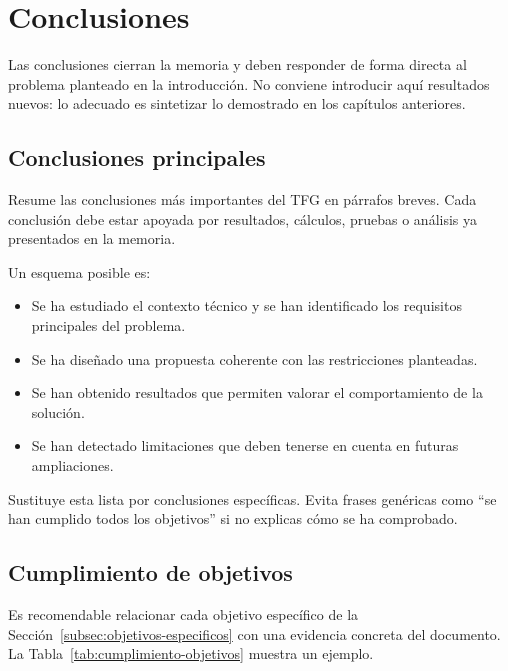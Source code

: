 \chapter{Conclusiones}
\label{cap:conclusiones}

Las conclusiones cierran la memoria y deben responder de forma directa al
problema planteado en la introducción. No conviene introducir aquí resultados
nuevos: lo adecuado es sintetizar lo demostrado en los capítulos anteriores.

\section{Conclusiones principales}
\label{sec:conclusiones-principales}

Resume las conclusiones más importantes del TFG en párrafos breves. Cada
conclusión debe estar apoyada por resultados, cálculos, pruebas o análisis ya
presentados en la memoria.

Un esquema posible es:

\begin{itemize}
    \item Se ha estudiado el contexto técnico y se han identificado los requisitos principales del problema.
    \item Se ha diseñado una propuesta coherente con las restricciones planteadas.
    \item Se han obtenido resultados que permiten valorar el comportamiento de la solución.
    \item Se han detectado limitaciones que deben tenerse en cuenta en futuras ampliaciones.
\end{itemize}

Sustituye esta lista por conclusiones específicas. Evita frases genéricas como
``se han cumplido todos los objetivos'' si no explicas cómo se ha comprobado.

\section{Cumplimiento de objetivos}
\label{sec:cumplimiento-objetivos}

Es recomendable relacionar cada objetivo específico de la
Sección~\ref{subsec:objetivos-especificos} con una evidencia concreta del
documento. La Tabla~\ref{tab:cumplimiento-objetivos} muestra un ejemplo.


